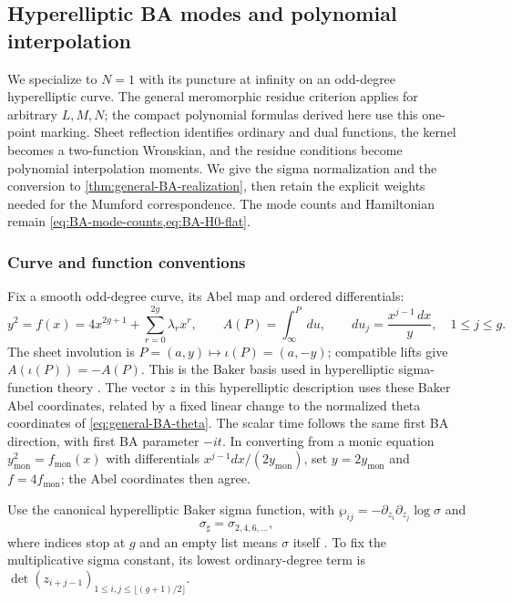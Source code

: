\subsection{Hyperelliptic BA modes and polynomial interpolation}
\label{sec:BA-realization}

We specialize to $N=1$ with its puncture at infinity on an odd-degree
hyperelliptic curve. The general meromorphic residue criterion applies
for arbitrary $L,M,N$; the compact polynomial formulas derived here
use this one-point marking. Sheet reflection identifies ordinary and dual
functions, the kernel becomes a two-function Wronskian, and the residue
conditions become polynomial interpolation moments. We give the sigma
normalization and the conversion to \cref{thm:general-BA-realization},
then retain the explicit weights needed for the Mumford correspondence.
The mode counts and Hamiltonian remain
\cref{eq:BA-mode-counts,eq:BA-H0-flat}.

\subsubsection{Curve and function conventions}

Fix a smooth odd-degree curve, its Abel map and ordered differentials:
\begin{equation}\label{eq:BA-curve}
 y^2=f(x)=4x^{2g+1}+\sum_{r=0}^{2g}\lambda_r x^r,\qquad
 A(P)=\int_\infty^P du,\qquad
 du_j=\frac{x^{j-1}\,dx}{y},\quad1\leq j\leq g.
\end{equation}
The sheet involution is $P=(a,y)\mapsto\iota(P)=(a,-y)$;
compatible lifts give $A(\iota(P))=-A(P)$.
This is the Baker basis used in hyperelliptic sigma-function theory
\cite{BEL1997,Onishi2005}.
The vector $z$ in this hyperelliptic description uses these Baker Abel coordinates,
related by a fixed linear change to the normalized theta coordinates
of \cref{eq:general-BA-theta}. The scalar time follows the same first BA direction, with first BA
parameter $-it$.
In converting
from a monic equation $y_{\mathrm{mon}}^2=f_{\mathrm{mon}}(x)$ with
differentials $x^{j-1}dx/(2y_{\mathrm{mon}})$, set
$y=2y_{\mathrm{mon}}$ and $f=4f_{\mathrm{mon}}$; the Abel coordinates
then agree.

Use the canonical hyperelliptic Baker sigma function, with
$\wp_{ij}=-\partial_{z_i}\partial_{z_j}\log\sigma$ and
\begin{equation}\label{eq:BA-sharp}
 \sigma_\sharp=\sigma_{2,4,6,\ldots},
\end{equation}
where indices stop at $g$ and an empty list means $\sigma$ itself
\cite{BEL1997,Onishi2005}. To fix the multiplicative sigma constant,
its lowest ordinary-degree term is
$\det(z_{i+j-1})_{1\leq i,j\leq\lfloor(g+1)/2\rfloor}$.

